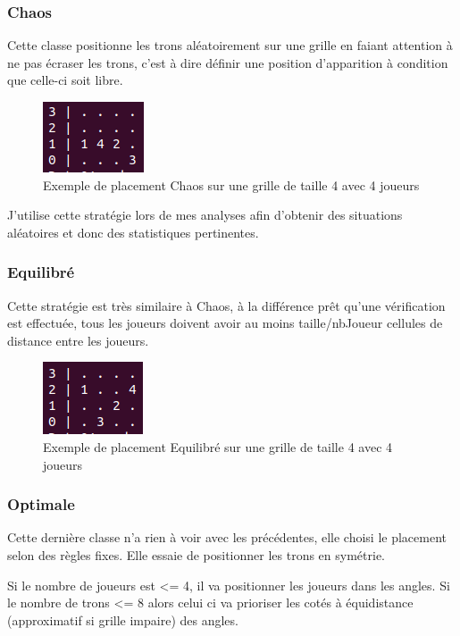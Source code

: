\documentclass[a4paper,12pt]{article}
\begin{document}
\subsubsection{Chaos}
Cette classe positionne les trons aléatoirement sur une grille en faiant attention à ne pas écraser les trons, c'est à dire définir une position d'apparition à condition que celle-ci soit libre.

\begin{figure}[h!]
		\centering	\includegraphics[width=0.2\linewidth]{Chaos}
		\caption{Exemple de placement Chaos sur une grille de taille 4 avec 4 joueurs}
	\end{figure}
		
J'utilise cette stratégie lors de mes analyses afin d'obtenir des situations aléatoires et donc des statistiques pertinentes.
	
\subsubsection{Equilibré}
Cette stratégie est très similaire à Chaos, à la différence prêt qu'une vérification est effectuée, tous les joueurs doivent avoir au moins taille/nbJoueur cellules de distance entre les joueurs.

\begin{figure}[h!]
		\centering	\includegraphics[width=0.2\linewidth]{Equilibre}
		\caption{Exemple de placement Equilibré sur une grille de taille 4 avec 4 joueurs}
	\end{figure}
	
\subsubsection{Optimale}
Cette dernière classe n'a rien à voir avec les précédentes, elle choisi le placement selon des règles fixes. Elle essaie de positionner les trons en symétrie. 

Si le nombre de joueurs est <= 4, il va positionner les joueurs dans les angles.
Si le nombre de trons <= 8 alors celui ci va prioriser les cotés à équidistance (approximatif si grille impaire) des angles.
\end{document}
